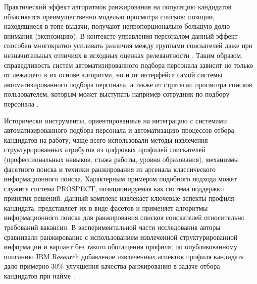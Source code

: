 Практический эффект алгоритмов ранжирования на популяцию кандидатов объясняется преимущественно моделью просмотра списков: позиции, находящиеся в топе выдачи, получают непропорционально большую долю внимания (экспозицию). В контексте управления персоналом данный эффект способен многократно усиливать различия между группами соискателей даже при незначительных отличиях в исходных оценках релевантности \cite{src02}. Таким образом, справедливость систем автоматизированного подбора персонала зависит не только от лежащего в их основе алгоритма, но и от интерфейса самой системы автоматизированного подбора персонала, а также от стратегии просмотра списков пользователем, которым может выступать например сотрудник по подбору персонала \cite{src02}.

Исторически инструменты, ориентированные на интеграцию с системами автоматизированного подбора персонала и автоматизацию процессов отбора кандидатов на работу, чаще всего использовали методы извлечения структурированных атрибутов из цифровых профилей соискателей (профессиональных навыков, стажа работы, уровня образования), механизмы фасетного поиска и техники ранжирования из арсенала классического информационного поиска. Характерным примером подобного подхода может служить система PROSPECT, позиционируемая как система поддержки принятия решений. Данный комплекс извлекает ключевые аспекты профиля кандидата, представляет их в виде фасетов и применяет алгоритмы информационного поиска для ранжирования списков соискателей относительно требований вакансии. В экспериментальной части исследования авторы сравнивали ранжирование с использованием извлеченной структурированной информации и вариант без такого обогащения профиля; по опубликованному описанию IBM Research добавление извлеченных аспектов профиля кандидата дало примерно 30\% улучшения качества ранжирования в задаче отбора кандидатов при найме \cite{src03}.

